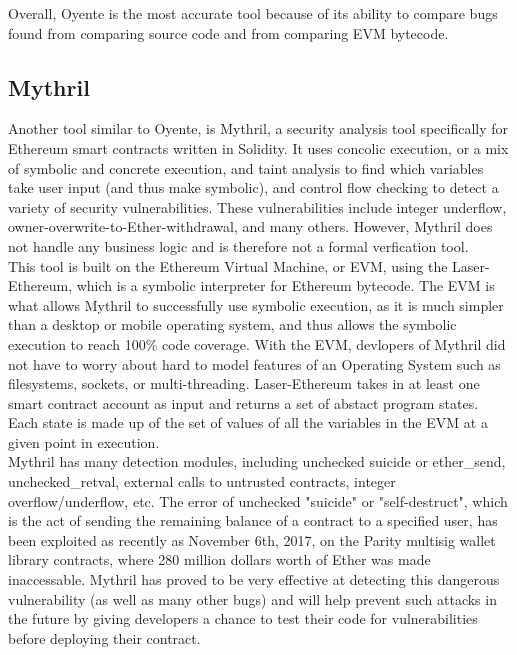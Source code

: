 Overall, Oyente is the most accurate tool because of its ability to compare bugs found from comparing source code and from comparing EVM bytecode. 


\subsection*{Mythril}

Another tool similar to Oyente, is Mythril, a security analysis tool specifically for Ethereum smart contracts written in Solidity. It uses concolic execution, or a mix of symbolic and concrete execution, and taint analysis to find which variables take user input (and thus make symbolic), and control flow checking to detect a variety of security vulnerabilities. These vulnerabilities include integer underflow, owner-overwrite-to-Ether-withdrawal, and many others. However, Mythril does not handle any business logic and is therefore not a formal verfication tool. \\

This tool is built on the Ethereum Virtual Machine, or EVM, using the Laser-Ethereum, which is a symbolic interpreter for Ethereum bytecode. The EVM is what allows Mythril to successfully use symbolic execution, as it is much simpler than a desktop or mobile operating system, and thus allows the symbolic execution to reach 100\%  code coverage. With the EVM,  devlopers of Mythril did not have to worry about hard to model features of an Operating System such as filesystems, sockets, or multi-threading. Laser-Ethereum takes in at least one smart contract account as input and returns a set of abstact program states. Each state is made up of the set of values of all the variables in the EVM at a given point in execution. \\

Mythril has many detection modules, including unchecked suicide or ether\_send, unchecked\_retval, external calls to untrusted contracts, integer overflow/underflow, etc. The error of unchecked "suicide" or "self-destruct", which is the act of sending the remaining balance of a contract to a specified user, has been exploited as recently as November 6th, 2017,  on the Parity multisig wallet library contracts, where 280 million dollars worth of Ether was made inaccessable. Mythril has proved to be very effective at detecting this dangerous vulnerability (as well as many other bugs) and will help prevent such attacks in the future by giving developers a chance to test their code for vulnerabilities before deploying their contract.

